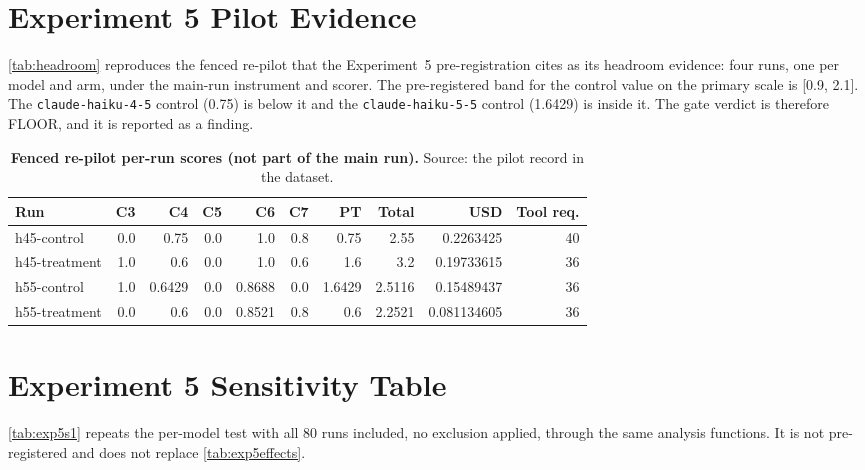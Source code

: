 \documentclass[11pt,a4paper]{article}
\begin{document}
\section{Experiment 5 Pilot Evidence}
\label{app:headroom}

\autoref{tab:headroom} reproduces the fenced re-pilot that the Experiment~5 pre-registration cites as its headroom evidence: four runs, one per model and arm, under the main-run instrument and scorer. The pre-registered band for the control value on the primary scale is [0.9, 2.1]. The \texttt{claude-haiku-4-5} control (0.75) is below it and the \texttt{claude-haiku-5-5} control (1.6429) is inside it. The gate verdict is therefore FLOOR, and it is reported as a finding.

\begin{table}[h]
\centering\small
\caption{\small \textbf{Fenced re-pilot per-run scores (not part of the main run).} Source: the pilot record in the dataset.}
\label{tab:headroom}
\begin{tabular}{lrrrrrrrrr}
\toprule
Run & C3 & C4 & C5 & C6 & C7 & PT & Total & USD & Tool req. \\
\midrule
h45-control   & 0.0 & 0.75   & 0.0 & 1.0    & 0.8 & 0.75   & 2.55   & 0.2263425  & 40 \\
h45-treatment & 1.0 & 0.6    & 0.0 & 1.0    & 0.6 & 1.6    & 3.2    & 0.19733615 & 36 \\
h55-control   & 1.0 & 0.6429 & 0.0 & 0.8688 & 0.0 & 1.6429 & 2.5116 & 0.15489437 & 36 \\
h55-treatment & 0.0 & 0.6    & 0.0 & 0.8521 & 0.8 & 0.6    & 2.2521 & 0.081134605 & 36 \\
\bottomrule
\end{tabular}
\end{table}

\section{Experiment 5 Sensitivity Table}
\label{app:exp5s1}

\autoref{tab:exp5s1} repeats the per-model test with all 80 runs included, no exclusion applied, through the same analysis functions. It is not pre-registered and does not replace \autoref{tab:exp5effects}.
\end{document}
